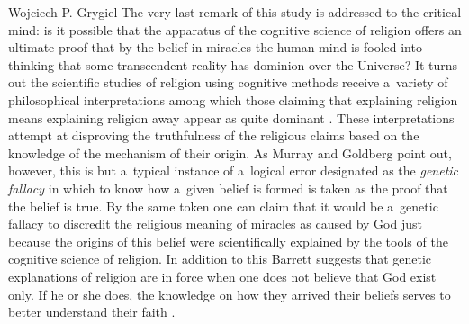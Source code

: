 \begin{artengenv}{Wojciech P. Grygiel}
The very last remark of this study is addressed to the critical mind: is it possible that the apparatus of the cognitive science of religion offers an ultimate proof that by the belief in miracles the human mind is fooled into thinking that some transcendent reality has dominion over the Universe? It turns out the scientific studies of religion using cognitive methods receive a~variety of philosophical interpretations among which those claiming that explaining religion means explaining religion away appear as quite dominant
\parencites[e.g.][p.76]{boyer_religion_2001}[][pp.78–79]{pyysiainen_cognition_2001}. %
 These interpretations attempt at disproving the truthfulness of the religious claims based on the knowledge of the mechanism of their origin. As Murray and Goldberg 
\parencite*[][pp.193–199]{murray_evolutionary_2010} %
 point out, however, this is but a~typical instance of a~logical error designated as the \textit{genetic fallacy} in which to know how a~given belief is formed is taken as the proof that the belief is true. By the same token one can claim that it would be a~genetic fallacy to discredit the religious meaning of miracles as caused by God just because the origins of this belief were scientifically explained by the tools of the cognitive science of religion. In addition to this Barrett suggests that genetic explanations of religion are in force when one does not believe that God exist only. If he or she does, the knowledge on how they arrived their beliefs serves to better understand their faith 
\parencites[][pp.148–155]{barrett_cognitive_2011}[see also][pp.51–54]{wszolek_wprowadzenie_2004}.%


\end{artengenv}
